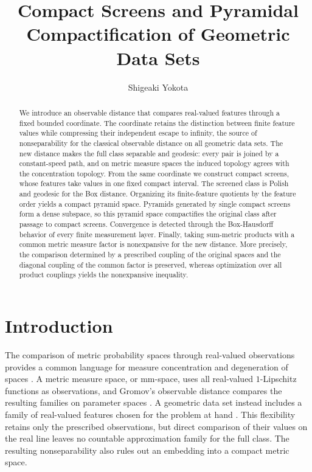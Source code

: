 \documentclass[11pt]{amsart}
\title[Compact Screens for Geometric Data Sets]{Compact Screens and Pyramidal Compactification of Geometric Data Sets}
\author{Shigeaki Yokota}
\date{}
\theoremstyle{plain}
\theoremstyle{definition}
\theoremstyle{remark}
\begin{document}
\begin{abstract}
We introduce an observable distance that compares real-valued features through a fixed bounded coordinate. The coordinate retains the distinction between finite feature values while compressing their independent escape to infinity, the source of nonseparability for the classical observable distance on all geometric data sets. The new distance makes the full class separable and geodesic: every pair is joined by a constant-speed path, and on metric measure spaces the induced topology agrees with the concentration topology. From the same coordinate we construct compact screens, whose features take values in one fixed compact interval. The screened class is Polish and geodesic for the Box distance. Organizing its finite-feature quotients by the feature order yields a compact pyramid space. Pyramids generated by single compact screens form a dense subspace, so this pyramid space compactifies the original class after passage to compact screens. Convergence is detected through the Box-Hausdorff behavior of every finite measurement layer. Finally, taking sum-metric products with a common metric measure factor is nonexpansive for the new distance. More precisely, the comparison determined by a prescribed coupling of the original spaces and the diagonal coupling of the common factor is preserved, whereas optimization over all product couplings yields the nonexpansive inequality.
\end{abstract}

\maketitle

\section{Introduction}
\label{sec:introduction}

The comparison of metric probability spaces through real-valued observations provides a common language for measure concentration and degeneration of spaces \cite[Chapter~3]{gromov2007met}. A metric measure space, or mm-space, uses all real-valued $1$-Lipschitz functions as observations, and Gromov's observable distance compares the resulting families on parameter spaces \cite[Definition~3\(\frac12\).45, p.~199]{gromov2007met}. A geometric data set instead includes a family of real-valued features chosen for the problem at hand \cite[Definition~3.1]{hanika2022gds}. This flexibility retains only the prescribed observations, but direct comparison of their values on the real line leaves no countable approximation family for the full class. The resulting nonseparability also rules out an embedding into a compact metric space.
\end{document}
